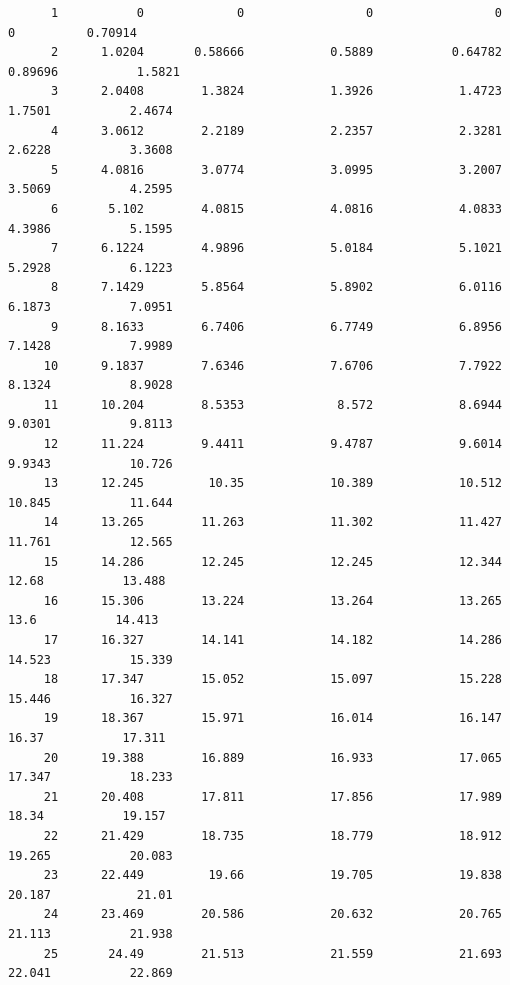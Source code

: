 \documentclass[
]{book}
\begin{document}
\begin{verbatim}
      1           0             0                 0                 0                 0          0.70914   
      2      1.0204       0.58666            0.5889           0.64782           0.89696           1.5821   
      3      2.0408        1.3824            1.3926            1.4723            1.7501           2.4674   
      4      3.0612        2.2189            2.2357            2.3281            2.6228           3.3608   
      5      4.0816        3.0774            3.0995            3.2007            3.5069           4.2595   
      6       5.102        4.0815            4.0816            4.0833            4.3986           5.1595   
      7      6.1224        4.9896            5.0184            5.1021            5.2928           6.1223   
      8      7.1429        5.8564            5.8902            6.0116            6.1873           7.0951   
      9      8.1633        6.7406            6.7749            6.8956            7.1428           7.9989   
     10      9.1837        7.6346            7.6706            7.7922            8.1324           8.9028   
     11      10.204        8.5353             8.572            8.6944            9.0301           9.8113   
     12      11.224        9.4411            9.4787            9.6014            9.9343           10.726   
     13      12.245         10.35            10.389            10.512            10.845           11.644   
     14      13.265        11.263            11.302            11.427            11.761           12.565   
     15      14.286        12.245            12.245            12.344             12.68           13.488   
     16      15.306        13.224            13.264            13.265              13.6           14.413   
     17      16.327        14.141            14.182            14.286            14.523           15.339   
     18      17.347        15.052            15.097            15.228            15.446           16.327   
     19      18.367        15.971            16.014            16.147             16.37           17.311   
     20      19.388        16.889            16.933            17.065            17.347           18.233   
     21      20.408        17.811            17.856            17.989             18.34           19.157   
     22      21.429        18.735            18.779            18.912            19.265           20.083   
     23      22.449         19.66            19.705            19.838            20.187            21.01   
     24      23.469        20.586            20.632            20.765            21.113           21.938   
     25       24.49        21.513            21.559            21.693            22.041           22.869   

\end{verbatim}
\end{document}
